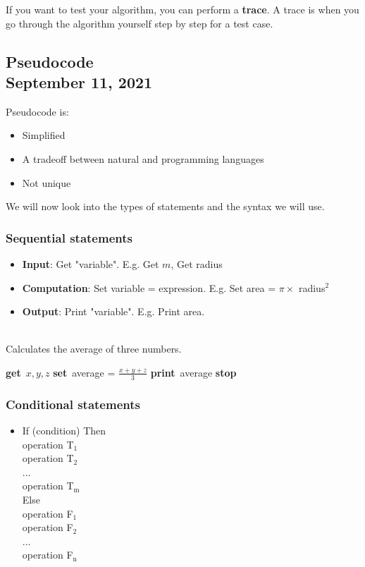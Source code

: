\documentclass[]{article}
\newcommand{\Get}{\State \textbf{get}~}
\newcommand{\Set}{\State \textbf{set}~}
\newcommand{\Print}{\State \textbf{print}~}
\newcommand{\Stop}{\State \textbf{stop}~}
\begin{document}
\noindent If you want to test your algorithm, you can perform a \textbf{trace}. A trace is when you go through the algorithm yourself step by step for a test case.


\subsection{Pseudocode\\ {\normalfont September 11, 2021}}
\bigbreak

Pseudocode is:

\begin{itemize}
	\item Simplified
	\item A tradeoff between natural and programming languages
	\item Not unique\smallskip
\end{itemize}

\noindent We will now look into the types of statements and the syntax we will use.

\subsubsection{Sequential statements}
\bigbreak
\begin{itemize}
	\item \textbf{Input}: Get "variable". E.g. Get $m$, Get radius
	\item \textbf{Computation}: Set variable = expression. E.g. Set area = $\pi \times$ radius$^2$
	\item \textbf{Output}: Print "variable". E.g. Print area.\smallskip
\end{itemize}

\begin{algorithm}
	\caption{\\Calculates the average of three numbers.}
	\begin{algorithmic}[1]
		\Get $x, y, z$
		\Set average = $\frac{x + y + z}{3}$
		\Print average
		\Stop
	\end{algorithmic}
\end{algorithm}

\subsubsection{Conditional statements}
\bigbreak
\begin{itemize}
	\item If (condition) Then\\
				\tabto{0.5cm}operation T$_1$\\
				\tabto{0.5cm}operation T$_2$\\ 
				\tabto{0.5cm}...\\
				\tabto{0.5cm}operation T$_\mathrm{m}$\\
			Else\\
				\tabto{0.5cm}operation F$_1$\\
				\tabto{0.5cm}operation F$_2$\\ 
				\tabto{0.5cm}...\\
				\tabto{0.5cm}operation F$_\mathrm{n}$\smallskip
\end{itemize}
\end{document}
